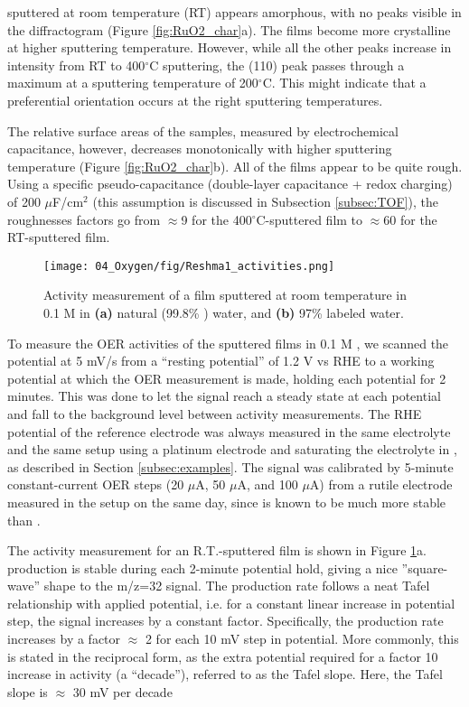  sputtered at room temperature (RT) appears amorphous, with no peaks visible in the diffractogram (Figure \ref{fig:RuO2_char}a). The films become more crystalline at higher sputtering temperature. However, while all the other peaks increase in intensity from RT to 400$^\circ$C sputtering, the (110) peak passes through a maximum at a sputtering temperature of 200$^\circ$C. This might indicate that a preferential orientation occurs at the right sputtering temperatures.

The relative surface areas of the samples, measured by electrochemical capacitance, however, decreases monotonically with higher sputtering temperature (Figure \ref{fig:RuO2_char}b). All of the films appear to be quite rough. Using a specific pseudo-capacitance (double-layer capacitance + redox charging) of 200 $\mu$F/cm$^2$ (this assumption is discussed in Subsection \ref{subsec:TOF})\cite{Yoshida2013}, the roughnesses factors go from $\approx$9 for the 400$^\circ$C-sputtered film to $\approx$60 for the RT-sputtered film. %

\begin{figure}[h!]
	\texttt{[image: 04\_Oxygen/fig/Reshma1\_activities.png]}
	\caption{Activity measurement of a  film sputtered at room temperature in 0.1 M  in \textbf{(a)} natural (99.8\% ) water, and \textbf{(b)} 97\%  labeled water.}
	\label{fig:Reshma1_activities}
\end{figure}


To measure the OER activities of the sputtered films in 0.1 M , we scanned the potential at 5 mV/s from a ``resting potential'' of 1.2 V vs RHE to a working potential at which the OER measurement is made, holding each potential for 2 minutes. This was done to let the  signal reach a steady state at each potential and fall to the background level between activity measurements. The RHE potential of the reference electrode was always measured in the same electrolyte and the same setup using a platinum electrode and saturating the electrolyte in , as described in Section \ref{subsec:examples}. The  signal was calibrated by 5-minute constant-current OER steps (20 $\mu$A, 50 $\mu$A, and 100 $\mu$A) from a rutile  electrode measured in the setup on the same day, since  is known to be much more stable than \cite{Reier2017}.

The activity measurement for an R.T.-sputtered film is shown in Figure \ref{fig:Reshma1_activities}a.  production is stable during each 2-minute potential hold, giving a nice ''square-wave'' shape to the m/z=32 signal. The  production rate follows a neat Tafel relationship with applied potential, i.e. for a constant linear increase in potential step, the  signal increases by a constant factor. Specifically, the  production rate increases by a factor $\approx$ 2 for each 10 mV step in potential. More commonly, this is stated in the reciprocal form, as the extra potential required for a factor 10 increase in activity (a ``decade''), referred to as the Tafel slope. Here, the Tafel slope is $\approx$ 30 mV per decade

